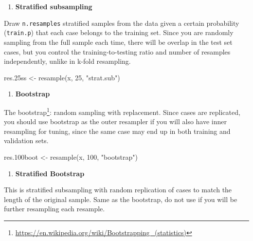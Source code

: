 \documentclass[
]{book}
\newenvironment{Shaded}{\begin{snugshade}}{\end{snugshade}}
\newcommand{\DecValTok}[1]{\textcolor[rgb]{0.00,0.00,0.81}{#1}}
\newcommand{\FloatTok}[1]{\textcolor[rgb]{0.00,0.00,0.81}{#1}}
\newcommand{\FunctionTok}[1]{\textcolor[rgb]{0.00,0.00,0.00}{#1}}
\newcommand{\NormalTok}[1]{#1}
\newcommand{\OtherTok}[1]{\textcolor[rgb]{0.56,0.35,0.01}{#1}}
\newcommand{\StringTok}[1]{\textcolor[rgb]{0.31,0.60,0.02}{#1}}
\DeclareRobustCommand{\href}[2]{#2\footnote{\url{#1}}}
\providecommand{\tightlist}{%
  \setlength{\itemsep}{0pt}\setlength{\parskip}{0pt}}
\begin{document}
\begin{enumerate}
\def\labelenumi{\arabic{enumi}.}
\setcounter{enumi}{1}
\tightlist
\item
  \textbf{Stratified subsampling}
\end{enumerate}

Draw \texttt{n.resamples} stratified samples from the data given a certain probability (\texttt{train.p}) that each case belongs to the training set. Since you are randomly sampling from the full sample each time, there will be overlap in the test set cases, but you control the training-to-testing ratio and number of resamples independently, unlike in k-fold resampling.

\begin{Shaded}
\begin{Highlighting}[]
\NormalTok{res}\FloatTok{.25}\NormalTok{ss }\OtherTok{\textless{}{-}} \FunctionTok{resample}\NormalTok{(x, }\DecValTok{25}\NormalTok{, }\StringTok{"strat.sub"}\NormalTok{)}
\end{Highlighting}
\end{Shaded}

\begin{enumerate}
\def\labelenumi{\arabic{enumi}.}
\setcounter{enumi}{2}
\tightlist
\item
  \textbf{Bootstrap}
\end{enumerate}

The \href{https://en.wikipedia.org/wiki/Bootstrapping_(statistics)}{bootstrap}: random sampling with replacement. Since cases are replicated, you should use bootstrap as the outer resampler if you will also have inner resampling for tuning, since the same case may end up in both training and validation sets.

\begin{Shaded}
\begin{Highlighting}[]
\NormalTok{res}\FloatTok{.100}\NormalTok{boot }\OtherTok{\textless{}{-}} \FunctionTok{resample}\NormalTok{(x, }\DecValTok{100}\NormalTok{, }\StringTok{"bootstrap"}\NormalTok{)}
\end{Highlighting}
\end{Shaded}

\begin{enumerate}
\def\labelenumi{\arabic{enumi}.}
\setcounter{enumi}{3}
\tightlist
\item
  \textbf{Stratified Bootstrap}
\end{enumerate}

This is stratified subsampling with random replication of cases to match the length of the original sample. Same as the bootstrap, do not use if you will be further resampling each resample.
\end{document}
